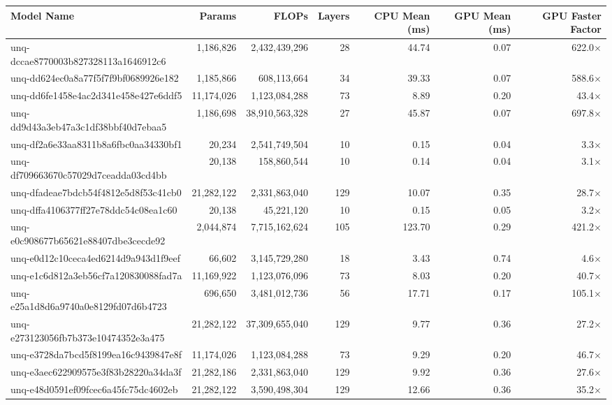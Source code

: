 \begin{table}[h!]
\centering
\fontsize{7}{9}\selectfont
\begin{tabular}{lrrrrrr}
\toprule
\textbf{Model Name} & \textbf{Params} & \textbf{FLOPs} & \textbf{Layers} & \textbf{CPU Mean (ms)} & \textbf{GPU Mean (ms)} & \textbf{GPU Faster Factor} \\
\midrule
unq-dccae8770003b827328113a1646912c6 & 1,186,826 & 2,432,439,296 & 28 & 44.74 & 0.07 & 622.0$\times$ \\
unq-dd624ec0a8a77f5f7f9bf0689926e182 & 1,185,866 & 608,113,664 & 34 & 39.33 & 0.07 & 588.6$\times$ \\
unq-dd6fe1458e4ac2d341e458e427e6ddf5 & 11,174,026 & 1,123,084,288 & 73 & 8.89 & 0.20 & 43.4$\times$ \\
unq-dd9d43a3eb47a3c1df38bbf40d7ebaa5 & 1,186,698 & 38,910,563,328 & 27 & 45.87 & 0.07 & 697.8$\times$ \\
unq-df2a6e33aa8311b8a6fbc0aa34330bf1 & 20,234 & 2,541,749,504 & 10 & 0.15 & 0.04 & 3.3$\times$ \\
unq-df709663670c57029d7ceadda03cd4bb & 20,138 & 158,860,544 & 10 & 0.14 & 0.04 & 3.1$\times$ \\
unq-dfadeae7bdcb54f4812e5d8f53c41cb0 & 21,282,122 & 2,331,863,040 & 129 & 10.07 & 0.35 & 28.7$\times$ \\
unq-dffa4106377ff27e78ddc54c08ea1c60 & 20,138 & 45,221,120 & 10 & 0.15 & 0.05 & 3.2$\times$ \\
unq-e0c908677b65621e88407dbe3cecde92 & 2,044,874 & 7,715,162,624 & 105 & 123.70 & 0.29 & 421.2$\times$ \\
unq-e0d12c10ceca4ed6214d9a943d1f9eef & 66,602 & 3,145,729,280 & 18 & 3.43 & 0.74 & 4.6$\times$ \\
unq-e1c6d812a3eb56cf7a120830088fad7a & 11,169,922 & 1,123,076,096 & 73 & 8.03 & 0.20 & 40.7$\times$ \\
unq-e25a1d8d6a9740a0e8129fd07d6b4723 & 696,650 & 3,481,012,736 & 56 & 17.71 & 0.17 & 105.1$\times$ \\
unq-e273123056fb7b373e10474352e3a475 & 21,282,122 & 37,309,655,040 & 129 & 9.77 & 0.36 & 27.2$\times$ \\
unq-e3728da7bcd5f8199ea16c9439847e8f & 11,174,026 & 1,123,084,288 & 73 & 9.29 & 0.20 & 46.7$\times$ \\
unq-e3aec622909575e3f83b28220a34da3f & 21,282,186 & 2,331,863,040 & 129 & 9.92 & 0.36 & 27.6$\times$ \\
unq-e48d0591ef09fcec6a45fc75dc4602eb & 21,282,122 & 3,590,498,304 & 129 & 12.66 & 0.36 & 35.2$\times$ \\

\end{tabular}
\end{table}
